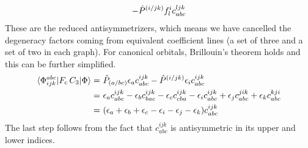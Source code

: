 \documentclass[11pt]{article}
\begin{document}
\begin{enumerate}
\begin{align*}
-
  \hat{P}^{(i/jk)}
  f_l^i
  c_{abc}^{ljk}
\end{align*}
  These are the reduced antisymmetrizers, which means we have cancelled the degeneracy factors coming from equivalent coefficient lines (a set of three and a set of two in each graph).
  For canonical orbitals, Brillouin's theorem holds and this can be further simplified.
\begin{align*}
  \langle\Phi _{ijk}^{abc}|F_{\mathrm{c}}\,C_3|\Phi \rangle
=&\
  \hat{P}_{(a/bc)}
  \epsilon _a
  c_{abc}^{ijk}
-
  \hat{P}^{(i/jk)}
  \epsilon _i
  c_{abc}^{ijk}
\\=&\
  \epsilon _a
  c_{abc}^{ijk}
-
  \epsilon _b
  c_{bac}^{ijk}
-
  \epsilon _c
  c_{cba}^{ijk}
-
  \epsilon _i
  c_{abc}^{ijk}
+
  \epsilon _j
  c_{abc}^{jik}
+
  \epsilon _k
  c_{abc}^{kji}
\\=&\
  (\epsilon _a + \epsilon _b + \epsilon _c - \epsilon _i - \epsilon _j - \epsilon _k)
  c_{abc}^{ijk}
\end{align*}
  The last step follows from the fact that $c_{abc}^{ijk}$ is antisymmetric in its upper and lower indices.


\end{enumerate}
\end{document}
